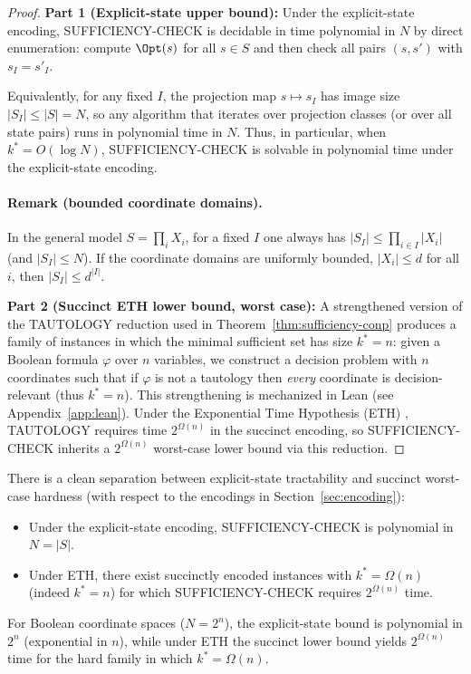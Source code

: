 \begin{proof}
\textbf{Part 1 (Explicit-state upper bound):} Under the explicit-state encoding, SUFFICIENCY-CHECK is decidable in time polynomial in $N$ by direct enumeration: compute $\Opt(s)$ for all $s\in S$ and then check all pairs $(s,s')$ with $s_I=s'_I$.

Equivalently, for any fixed $I$, the projection map $s\mapsto s_I$ has image size $|S_I|\le |S|=N$, so any algorithm that iterates over projection classes (or over all state pairs) runs in polynomial time in $N$. Thus, in particular, when $k^*=O(\log N)$, SUFFICIENCY-CHECK is solvable in polynomial time under the explicit-state encoding.

\paragraph{Remark (bounded coordinate domains).} In the general model $S=\prod_i X_i$, for a fixed $I$ one always has $|S_I|\le \prod_{i\in I}|X_i|$ (and $|S_I|\le N$). If the coordinate domains are uniformly bounded, $|X_i|\le d$ for all $i$, then $|S_I|\le d^{|I|}$.

\textbf{Part 2 (Succinct ETH lower bound, worst case):} A strengthened version of the TAUTOLOGY reduction used in Theorem~\ref{thm:sufficiency-conp} produces a family of instances in which the minimal sufficient set has size $k^* = n$: given a Boolean formula $\varphi$ over $n$ variables, we construct a decision problem with $n$ coordinates such that if $\varphi$ is not a tautology then \emph{every} coordinate is decision-relevant (thus $k^*=n$). This strengthening is mechanized in Lean (see Appendix~\ref{app:lean}). Under the Exponential Time Hypothesis (ETH) \cite{impagliazzo2001complexity,arora2009computational}, TAUTOLOGY requires time $2^{\Omega(n)}$ in the succinct encoding, so SUFFICIENCY-CHECK inherits a $2^{\Omega(n)}$ worst-case lower bound via this reduction.
\end{proof}

\begin{corollary}
There is a clean separation between explicit-state tractability and succinct worst-case hardness (with respect to the encodings in Section~\ref{sec:encoding}):
\begin{itemize}
\item Under the explicit-state encoding, SUFFICIENCY-CHECK is polynomial in $N=|S|$.
\item Under ETH, there exist succinctly encoded instances with $k^* = \Omega(n)$ (indeed $k^*=n$) for which SUFFICIENCY-CHECK requires $2^{\Omega(n)}$ time.
\end{itemize}
For Boolean coordinate spaces ($N = 2^n$), the explicit-state bound is polynomial in $2^n$ (exponential in $n$), while under ETH the succinct lower bound yields $2^{\Omega(n)}$ time for the hard family in which $k^* = \Omega(n)$.
\end{corollary}

